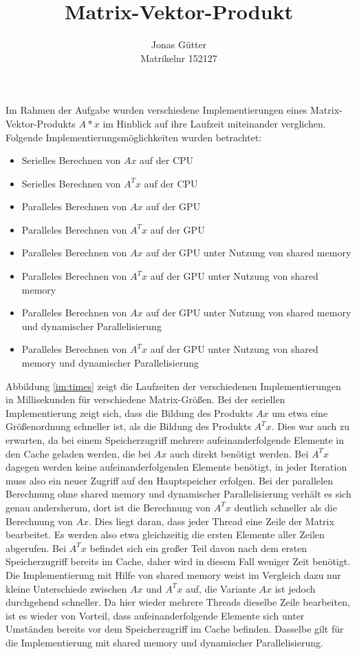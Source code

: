 \documentclass[11pt]{scrreprt}
\title{Matrix-Vektor-Produkt}
\author{Jonas Gütter\\ Matrikelnr 152127}
\begin{document}

\maketitle Im Rahmen der Aufgabe wurden verschiedene Implementierungen eines Matrix-Vektor-Produkts $A*x$ im Hinblick auf ihre Laufzeit miteinander verglichen. Folgende Implementierungsmöglichkeiten wurden betrachtet:

\begin{itemize}
\item Serielles Berechnen von $Ax$ auf der CPU
\item Serielles Berechnen von $A^T  x$ auf der CPU
\item Paralleles Berechnen von $Ax$ auf der GPU
\item Paralleles Berechnen von $A^T  x$ auf der GPU
\item Paralleles Berechnen von $Ax$ auf der GPU unter Nutzung von shared memory
\item Paralleles Berechnen von $A^T x$ auf der GPU unter Nutzung von shared memory
\item Paralleles Berechnen von $Ax$ auf der GPU unter Nutzung von shared memory und dynamischer Parallelisierung
\item Paralleles Berechnen von $A^T  x$ auf der GPU unter Nutzung von shared memory und dynamischer Parallelisierung
\end{itemize}
Abbildung \ref{im:times} zeigt die Laufzeiten der verschiedenen Implementierungen in Millisekunden für verschiedene Matrix-Größen. Bei der seriellen Implementierung zeigt sich, dass die Bildung des Produkts $Ax$ um etwa eine Größenordnung schneller ist, als die Bildung des Produkts $A^Tx$. Dies war auch zu erwarten, da bei einem Speicherzugriff mehrere aufeinanderfolgende Elemente in den Cache geladen werden, die bei $Ax$ auch direkt benötigt werden. Bei $A^Tx$ dagegen werden keine aufeinanderfolgenden Elemente benötigt, in jeder Iteration muss also ein neuer Zugriff auf den Hauptspeicher erfolgen. Bei der parallelen Berechnung ohne shared memory und dynamischer Parallelisierung verhält es sich genau andersherum, dort ist die Berechnung von $A^Tx$ deutlich schneller als die Berechnung von $Ax$. Dies liegt daran, dass jeder Thread eine Zeile der Matrix bearbeitet. Es werden also etwa gleichzeitig die ersten Elemente aller Zeilen abgerufen. Bei $A^Tx$ befindet sich ein großer Teil davon nach dem ersten Speicherzugriff bereits im Cache, daher wird in diesem Fall weniger Zeit benötigt. Die Implementierung mit Hilfe von shared memory weist im Vergleich dazu nur kleine Unterschiede zwischen $Ax$ und $A^Tx$ auf, die Variante $Ax$ ist jedoch durchgehend schneller. Da hier wieder mehrere Threads dieselbe Zeile bearbeiten, ist es wieder von Vorteil, dass aufeinanderfolgende Elemente sich unter Umständen bereits vor dem Speicherzugriff im Cache befinden. Dasselbe gilt für die Implementierung mit shared memory und dynamischer Parallelisierung.
\end{document}
